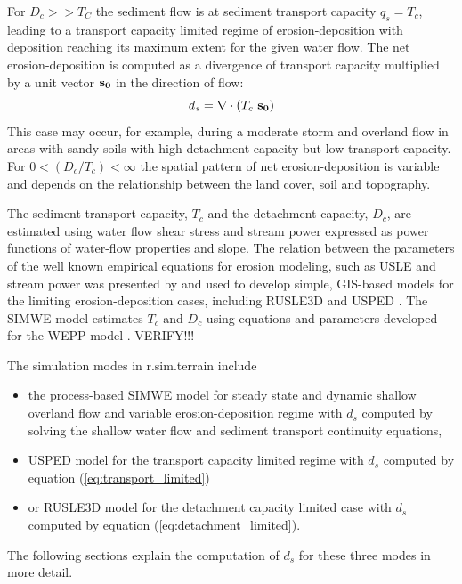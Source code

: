 \documentclass[gmd, manuscript]{copernicus}
\begin{document}
For  $D_c >> T_C$ the sediment flow is at sediment transport capacity $q_s = T_c$, 
leading to a transport capacity limited regime of erosion-deposition with deposition reaching its maximum
extent for the given water flow. The net erosion-deposition is computed as a divergence of
transport capacity multiplied by a unit vector ${\bf s_0}$ in the direction of flow:
\begin{equation}
\label{eq:transport_limited}
 d_s = \nabla\cdot (T_c ~ {\bf s_0})
\end{equation}
This case may occur, for example, during a moderate storm and overland flow in areas 
with sandy soils with high detachment capacity but
low transport capacity.
For $0 < ({D_c / T_c}) < \infty$ the spatial pattern of net erosion-deposition is variable and depends on the 
relationship between the land cover, soil and topography.

The sediment-transport capacity, $T_c $ and the detachment capacity, $D_c $,
are estimated using water flow shear stress and stream power
expressed as power functions of water-flow properties and slope.    
The relation between the parameters of the well known empirical equations for erosion modeling, such as USLE 
and stream power was presented by \citep{MooreBurch1984} and used to develop
simple, GIS-based models for the limiting erosion-deposition cases, including RUSLE3D and USPED \citep{Mitasova2001}.
The SIMWE model estimates $T_c$ and $D_c$ using equations and parameters developed for the WEPP model \citep{Flanagan2013}.
VERIFY!!!

The simulation modes in r.sim.terrain include 
\begin{itemize}
  \item the process-based SIMWE model for steady state and dynamic shallow overland flow 
   and variable erosion-deposition regime with $d_s$ computed 
   by solving the shallow water flow and sediment transport continuity equations,
  \item USPED model for the transport capacity limited regime with $d_s$ computed by equation (\ref{eq:transport_limited})
  \item or RUSLE3D model for the detachment capacity limited case with $d_s$ computed by equation (\ref{eq:detachment_limited}). 
\end{itemize}
The following sections explain the computation of $d_s$ for these three modes in more detail.
\end{document}
